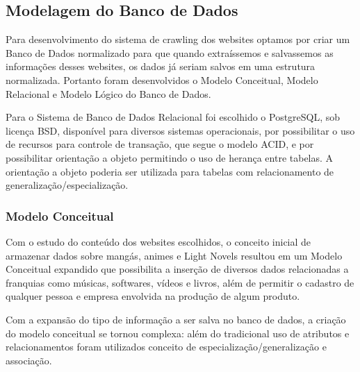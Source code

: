 \documentclass[12pt]{article}
\begin{document}

\subsection{Modelagem do Banco de Dados}

Para desenvolvimento do sistema de crawling dos websites optamos por criar um Banco de Dados normalizado para que quando extraíssemos e salvassemos as informações desses websites, os dados já seriam salvos em uma estrutura normalizada. 
Portanto foram desenvolvidos o Modelo Conceitual, Modelo Relacional e Modelo Lógico do Banco de Dados. 

Para o Sistema de Banco de Dados Relacional foi escolhido o PostgreSQL, sob licença BSD, disponível para diversos sistemas operacionais, por possibilitar o uso de recursos para controle de transação, que segue o modelo ACID, e por possibilitar orientação a objeto permitindo o uso de herança entre tabelas. A orientação a objeto poderia ser utilizada para tabelas com relacionamento de generalização/especialização. 


\subsubsection{Modelo Conceitual}

Com o estudo do conteúdo dos websites escolhidos, o conceito inicial de armazenar dados sobre mangás, animes e Light Novels resultou em um Modelo Conceitual expandido que possibilita a inserção de diversos dados relacionadas a franquias como músicas, softwares, vídeos e livros, além de permitir o cadastro de qualquer pessoa e empresa envolvida na produção de algum produto.

Com a expansão do tipo de informação a ser salva no banco de dados, a criação do modelo conceitual se tornou complexa: além do tradicional uso de atributos e relacionamentos foram utilizados conceito de especialização/generalização e associação. 
\end{document}
